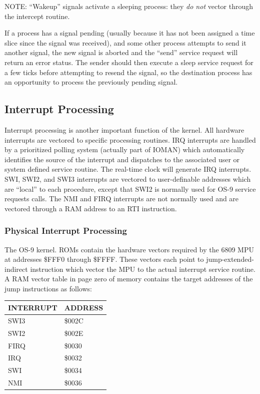 \documentclass[
]{article}
\newcounter{none} %
\begin{document}
NOTE: ``Wakeup'' signals activate a sleeping process: they \emph{do not}
vector through the intercept routine.

If a process has a signal pending (usually because it has not been
assigned a time slice since the signal was received), and some other
process attempts to send it another signal, the new signal is aborted
and the ``send'' service request will return an error status. The sender
should then execute a sleep service request for a few ticks before
attempting to resend the signal, so the destination process has an
opportunity to process the previously pending signal.

\subsection{Interrupt Processing}

Interrupt processing is another important function of the kernel. All
hardware interrupts are vectored to specific processing routines. IRQ
interrupts are handled by a prioritized polling system (actually part of
IOMAN) which automatically identifies the source of the interrupt and
dispatches to the associated user or system defined service routine. The
real-time clock will generate IRQ interrupts. SWI, SWI2, and SWI3
interrupts are vectored to user-definable addresses which are ``local''
to each procedure, except that SWI2 is normally used for OS-9 service
requests calls. The NMI and FIRQ interrupts are not normally used and
are vectored through a RAM address to an RTI instruction.

\subsubsection{Physical Interrupt Processing}

The OS-9 kernel. ROMs contain the hardware vectors required by the 6809
MPU at addresses \$FFF0 through \$FFFF. These vectors each point to
jump-extended-indirect instruction which vector the MPU to the actual
interrupt service routine. A RAM vector table in page zero of memory
contains the target addresses of the jump instructions as follows:

{\def\LTcaptype{none} %
\begin{longtable}[]{@{}
  >{\raggedright\arraybackslash}p{}
  >{\raggedright\arraybackslash}p{}@{}}
\toprule\noalign{}
\begin{minipage}[b]{\linewidth}\raggedright
INTERRUPT
\end{minipage} & \begin{minipage}[b]{\linewidth}\raggedright
ADDRESS
\end{minipage} \\
\midrule\noalign{}
\endhead
\bottomrule\noalign{}
\endlastfoot
SWI3 & \$002C \\
SWI2 & \$002E \\
FIRQ & \$0030 \\
IRQ & \$0032 \\
SWI & \$0034 \\
NMI & \$0036 \\
\end{longtable}
}
\end{document}
